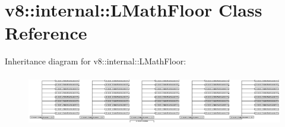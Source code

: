 \hypertarget{classv8_1_1internal_1_1_l_math_floor}{}\section{v8\+:\+:internal\+:\+:L\+Math\+Floor Class Reference}
\label{classv8_1_1internal_1_1_l_math_floor}
Inheritance diagram for v8\+:\+:internal\+:\+:L\+Math\+Floor\+:\begin{figure}[H]
\begin{center}
\leavevmode
\includegraphics[height=2.289963cm]{classv8_1_1internal_1_1_l_math_floor}
\end{center}
\end{figure}
